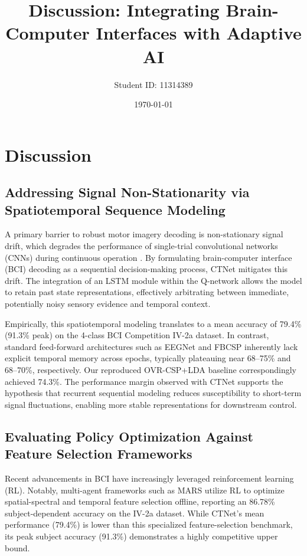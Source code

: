 \documentclass[twocolumn]{article}
\title{\textbf{Discussion: Integrating Brain-Computer Interfaces with Adaptive AI}}
\author{Student ID: 11314389}
\date{\today}
\begin{document}
\maketitle

\section{Discussion}

\subsection{Addressing Signal Non-Stationarity via Spatiotemporal Sequence Modeling}

A primary barrier to robust motor imagery decoding is non-stationary signal drift, which degrades the performance of single-trial convolutional networks (CNNs) during continuous operation \cite{hameed2025enhancing, prev_student2024}. By formulating brain-computer interface (BCI) decoding as a sequential decision-making process, CTNet mitigates this drift. The integration of an LSTM module within the Q-network allows the model to retain past state representations, effectively arbitrating between immediate, potentially noisy sensory evidence and temporal context.

Empirically, this spatiotemporal modeling translates to a mean accuracy of 79.4\% (91.3\% peak) on the 4-class BCI Competition IV-2a dataset. In contrast, standard feed-forward architectures such as EEGNet and FBCSP inherently lack explicit temporal memory across epochs, typically plateauing near 68--75\% and 68--70\%, respectively. Our reproduced OVR-CSP+LDA baseline correspondingly achieved 74.3\%. The performance margin observed with CTNet supports the hypothesis that recurrent sequential modeling reduces susceptibility to short-term signal fluctuations, enabling more stable representations for downstream control.

\subsection{Evaluating Policy Optimization Against Feature Selection Frameworks}

Recent advancements in BCI have increasingly leveraged reinforcement learning (RL). Notably, multi-agent frameworks such as MARS \cite{shin2024mars} utilize RL to optimize spatial-spectral and temporal feature selection offline, reporting an 86.78\% subject-dependent accuracy on the IV-2a dataset. While CTNet's mean performance (79.4\%) is lower than this specialized feature-selection benchmark, its peak subject accuracy (91.3\%) demonstrates a highly competitive upper bound.
\end{document}
